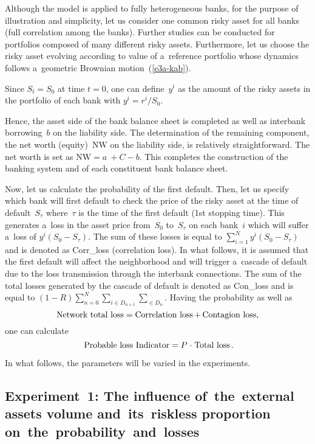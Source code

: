 \begin{multicols}{2}

Although the model is applied to fully heterogeneous banks, for the purpose of 
illustration and simplicity, let us consider one common risky asset for all banks 
(full correlation among the banks). Further studies can be conducted for 
portfolios composed  of many  different risky assets. Furthermore, let us choose the 
risky asset evolving according to value of a~reference portfolio  whose dynamics 
follows a~geometric Brownian motion~(\ref{e3a-kab}).

Since $S_t = S_0$  at time $t = 0$, one can define~$y^i$ as the amount of the 
risky assets in the portfolio of each bank with $y^i =r^i/S_0$.

Hence, the asset side of the bank balance sheet is completed as well as interbank 
borrowing~$b$ on the liability side. The determination of the remaining 
component, the net worth (equity)~$\mathrm{NW}$ on the liability side, is relatively 
straightforward. The net worth is set as 
$\mathrm{NW} = a~+C -b$. This completes the construction of the banking system and of 
each constituent bank balance sheet. 

Now, let us calculate the probability of the first default. Then, let us
specify which 
bank will first default to check the price of the risky asset at the time of 
default~$S_\tau$ where~$\tau$ is the time of the first default (1st stopping 
time). This generates a~loss in the asset price from~$S_0$  to~$S_\tau$   on 
each bank~$i$ which will suffer a~loss of  $y^i  (S_0  - S_\tau )$. The sum of 
these losses  is equal to $\sum^N_{i=1} y^i  (S_0  - S_\tau )$ and is denoted   
as Corr\_loss (correlation loss).
In what follows, it is assumed that the first default will affect the neighborhood  
and will trigger a~cascade of default due to the loss transmission through the 
interbank connections. The sum of the total losses generated by the cascade of 
default is denoted as Con\_loss and is equal to $(1-R) \sum\nolimits^N_{n=0} 
\sum\nolimits_{i\in  D_{n+1}} \sum\nolimits_{ \in D_n}$. 
Having the probability as well as
$$
\mbox{Network\ total\ loss\;=\;Correlation\ loss\,+\,Contagion\ loss,}
$$ 
one can calculate  
$$
\mbox{
Probable\ loss\ Indicator\;=\;$P$\;$\cdot$\;Total\ loss\,.}
$$

In what follows, the parameters will be varied in the experiments.  

\subsection{Experiment~1: The influence of~the~external assets volume 
and~its~riskless proportion on~the~probability~and~losses}


\end{multicols}
